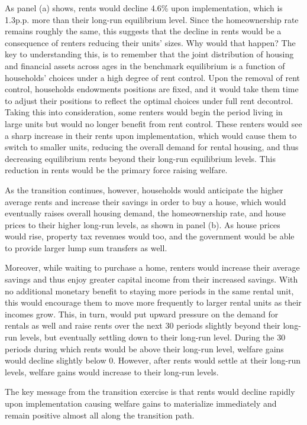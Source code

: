 \documentclass[parskip=full]{article}
\begin{document}
As panel (a) shows, rents would decline 4.6\% upon implementation, which is 1.3p.p. more than their long-run equilibrium level. Since the homeownership rate remains roughly the same, this suggests that the decline in rents would be a consequence of renters reducing their units' sizes. Why would that happen? The key to understanding this, is to remember that the joint distribution of housing and financial assets across ages in the benchmark equilibrium is a function of households' choices under a high degree of rent control. Upon the removal of rent control, households endowments positions are fixed, and it would take them time to adjust their positions to reflect the optimal choices under full rent decontrol. Taking this into consideration, some renters would begin the period living in large units but would no longer benefit from rent control. These renters would see a sharp increase in their rents upon implementation, which would cause them to switch to smaller units, reducing the overall demand for rental housing, and thus decreasing equilibrium rents beyond their long-run equilibrium levels. This reduction in rents would be the primary force raising welfare. 

As the transition continues, however, households would anticipate the higher average rents and increase their savings in order to buy a house, which would eventually raises overall housing demand, the homeownership rate, and house prices to their higher long-run levels, as shown in panel (b). As house prices would rise, property tax revenues would too, and the government would be able to provide larger lump sum transfers as well.

Moreover, while waiting to purchase a home, renters would increase their average savings and thus enjoy greater capital income from their increased savings. With no additional monetary benefit to staying more periods in the same rental unit, this would encourage them to move more frequently to larger rental units as their incomes grow. This, in turn, would put upward pressure on the demand for rentals as well and raise rents over the next 30 periods slightly beyond their long-run levels, but eventually settling down to their long-run level. During the 30 periods during which rents would be above their long-run level, welfare gains would decline slightly below 0. However, after rents would settle at their long-run levels, welfare gains would increase to their long-run levels.

The key message from the transition exercise is that rents would decline rapidly upon implementation causing welfare gains to materialize immediately and remain positive almost all along the transition path.
\end{document}
